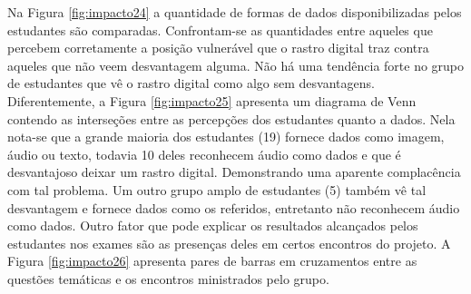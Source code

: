 \documentclass[
]{book}
\begin{document}
Na Figura \ref{fig:impacto24} a quantidade de formas de dados disponibilizadas pelos estudantes são comparadas. Confrontam-se as quantidades entre aqueles que percebem corretamente a posição vulnerável que o rastro digital traz contra aqueles que não veem desvantagem alguma. Não há uma tendência forte no grupo de estudantes que vê o rastro digital como algo sem desvantagens. Diferentemente, a Figura \ref{fig:impacto25} apresenta um diagrama de Venn contendo as interseções entre as percepções dos estudantes quanto a dados. Nela nota-se que a grande maioria dos estudantes (19) fornece dados como imagem, áudio ou texto, todavia 10 deles reconhecem áudio como dados e que é desvantajoso deixar um rastro digital. Demonstrando uma aparente complacência com tal problema. Um outro grupo amplo de estudantes (5) também vê tal desvantagem e fornece dados como os referidos, entretanto não reconhecem áudio como dados.
Outro fator que pode explicar os resultados alcançados pelos estudantes nos exames são as presenças deles em certos encontros do projeto. A Figura \ref{fig:impacto26} apresenta pares de barras em cruzamentos entre as questões temáticas e os encontros ministrados pelo grupo.
\end{document}
